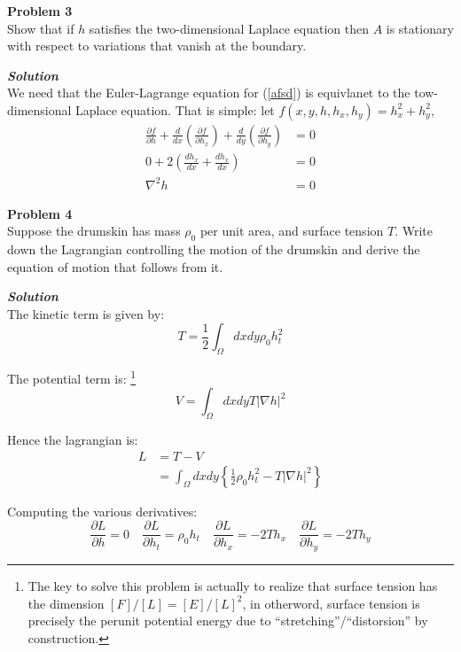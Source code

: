 \begin{framed}
\textbf{\textbf{Problem 3}}\\
Show that if $h$ satisfies the two-dimensional Laplace equation then $A$ is stationary with
respect to variations that vanish at the boundary.
\end{framed}

\begin{framed}
\textbf{\textit{Solution}}\\
We need that the Euler-Lagrange equation for (\ref{afsd}) is equivlanet to the tow-dimensional Laplace equation. That is simple: let $f(x,y,h, h_x,h_y)=h_x^2 + h_y^2$,
\begin{equation}
\begin{aligned}
\frac{\partial f}{\partial h} + \frac{d}{dx}\left(\frac{\partial f}{\partial h_x}\right) + \frac{d}{dy}\left(\frac{\partial f}{\partial h_y}\right) &= 0 \\
 0 + 2\left(\frac{dh_x}{dx} +  \frac{dh_x}{dx}\right) &= 0\\
 \nabla^2 h &=0
\end{aligned}
\end{equation}
\end{framed}

\begin{framed}
\textbf{\textbf{Problem 4}}\\
Suppose the drumskin has mass $\rho_0$ per unit area, and surface tension $T$. Write down
the Lagrangian controlling the motion of the drumskin and derive the equation of
motion that follows from it.
\end{framed}

\begin{framed}
\textbf{\textit{Solution}}\\
The kinetic term is given by:
\begin{equation}
T=\frac12 \int_{\Omega} dxdy \rho_0h_t^2
\end{equation}

The potential term is: \footnote{The key to solve this problem is actually to realize that surface tension has the dimension $[F]/[L]=[E]/[L]^2$, in otherword, surface tension is precisely the perunit potential energy due to ``stretching''/``distorsion'' by construction.}
\begin{equation}
V=\int_{\Omega} dxdy T|\nabla h|^2
\end{equation}

Hence the lagrangian is:
\begin{equation}
\begin{aligned}
L &= T-V \\
&= \int_{\Omega} dxdy \left\{\frac12 \rho_0h_t^2 - T|\nabla h|^2 \right\}
\end{aligned}
\end{equation}

Computing the various derivatives:
\begin{equation}
\frac{\partial L}{\partial h}=0 \quad \frac{\partial L}{\partial h_t}=\rho_0 h_t \quad \frac{\partial L}{\partial h_x}=-2Th_{x} \quad \frac{\partial L}{\partial h_y}=-2Th_{y}
\end{equation}
\end{framed}